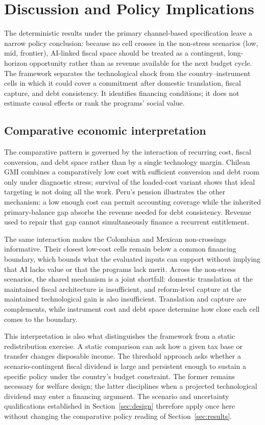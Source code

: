 \section{Discussion and Policy Implications}\label{sec:discussion}

The deterministic results under the primary channel-based specification leave a narrow policy conclusion: because no cell crosses in the non-stress scenarios (low, mid, frontier), AI-linked fiscal space should be treated as a contingent, long-horizon opportunity rather than as revenue available for the next budget cycle. The framework separates the technological shock from the country--instrument cells in which it could cover a commitment after domestic translation, fiscal capture, and debt consistency. It identifies financing conditions; it does not estimate causal effects or rank the programs' social value.

\subsection{Comparative economic interpretation}\label{subsec:discussion_comparative}

The comparative pattern is governed by the interaction of recurring cost, fiscal conversion, and debt space rather than by a single technology margin. Chilean GMI combines a comparatively low cost with sufficient conversion and debt room only under diagnostic stress; survival of the loaded-cost variant shows that ideal targeting is not doing all the work. Peru's pension illustrates the other mechanism: a low enough cost can permit accounting coverage while the inherited primary-balance gap absorbs the revenue needed for debt consistency. Revenue used to repair that gap cannot simultaneously finance a recurrent entitlement.

The same interaction makes the Colombian and Mexican non-crossings informative. Their closest low-cost cells remain below a common financing boundary, which bounds what the evaluated inputs can support without implying that AI lacks value or that the programs lack merit. Across the non-stress scenarios, the shared mechanism is a joint shortfall: domestic translation at the maintained fiscal architecture is insufficient, and reform-level capture at the maintained technological gain is also insufficient. Translation and capture are complements, while instrument cost and debt space determine how close each cell comes to the boundary.

This interpretation is also what distinguishes the framework from a static redistribution exercise. A static comparison can ask how a given tax base or transfer changes disposable income. The threshold approach asks whether a scenario-contingent fiscal dividend is large and persistent enough to sustain a specific policy under the country's budget constraint. The former remains necessary for welfare design; the latter disciplines when a projected technological dividend may enter a financing argument. The scenario and uncertainty qualifications established in Section~\ref{sec:design} therefore apply once here without changing the comparative policy reading of Section~\ref{sec:results}.

